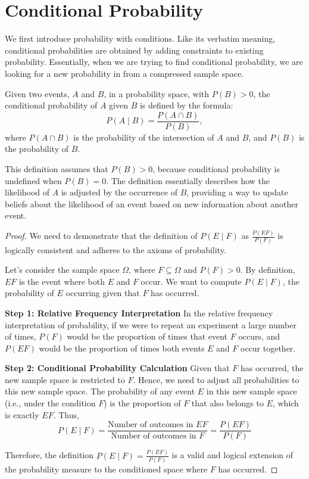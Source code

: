 \section{Conditional Probability}
We first introduce probability with conditions. Like its verbatim meaning, conditional probabilities are obtained by adding constraints to existing probability. Essentially, when we 
are trying to find conditional probability, we are looking for a new probability in from a compressed sample space.
\begin{definition}\label{def:condprob}
    Given two events, \(A\) and \(B\), in a probability space, with \(P(B) > 0\), the conditional probability of \(A\) given \(B\) is defined by the formula:
    \[
    P(A \mid B) = \frac{P(A \cap B)}{P(B)},
    \]
    where \(P(A \cap B)\) is the probability of the intersection of \(A\) and \(B\), and \(P(B)\) is the probability of \(B\).
    \end{definition}
\begin{remark}
    This definition assumes that \(P(B) > 0\), because conditional probability is undefined when \(P(B) = 0\). The definition essentially describes how the likelihood of \(A\) is adjusted by the occurrence of \(B\), providing a way to update beliefs about the likelihood of an event based on new information about another event.
\end{remark}
\begin{proof}
    We need to demonstrate that the definition of \( P(E \mid F) \) as \( \frac{P(EF)}{P(F)} \) is logically consistent and adheres to the axioms of probability.
    
    Let's consider the sample space \(\Omega\), where \( F \subseteq \Omega \) and \( P(F) > 0 \). By definition, \( EF \) is the event where both \( E \) and \( F \) occur. We want to compute \( P(E \mid F) \), the probability of \( E \) occurring given that \( F \) has occurred.
    
    \textbf{Step 1: Relative Frequency Interpretation}
    In the relative frequency interpretation of probability, if we were to repeat an experiment a large number of times, \( P(F) \) would be the proportion of times that event \( F \) occurs, and \( P(EF) \) would be the proportion of times both events \( E \) and \( F \) occur together.
    
    \textbf{Step 2: Conditional Probability Calculation}
    Given that \( F \) has occurred, the new sample space is restricted to \( F \). Hence, we need to adjust all probabilities to this new sample space. The probability of any event \( E \) in this new sample space (i.e., under the condition \( F \)) is the proportion of \( F \) that also belongs to \( E \), which is exactly \( EF \). Thus,
    \[
    P(E \mid F) = \frac{\text{Number of outcomes in } EF}{\text{Number of outcomes in } F} = \frac{P(EF)}{P(F)}
    \]
    
    Therefore, the definition \( P(E \mid F) = \frac{P(EF)}{P(F)} \) is a valid and logical extension of the probability measure to the conditioned space where \( F \) has occurred.
    \end{proof}
    
